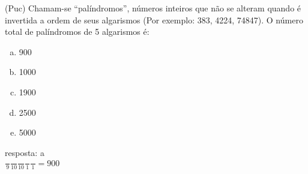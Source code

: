 \begin{ex}
 (Puc) Chamam-se “palíndromos”, números inteiros que não se alteram quando é invertida a ordem de seus algarismos (Por exemplo: 383, 4224, 74847). O número total de palíndromos de 5 algarismos é:
    \begin{enumerate}[(a)]
    \item 900
    \item 1000
    \item 1900
    \item 2500
    \item 5000
    \end{enumerate}
      \begin{sol}
        resposta: a \\
        $\frac{\phantom{A}}{9}\frac{\phantom{A}}{10}\frac{\phantom{A}}{10}\frac{\phantom{A}}{1}\frac{\phantom{A}}{1}=900$
      \end{sol}
\end{ex}